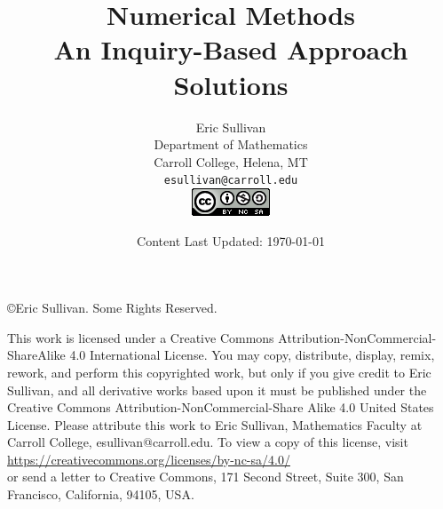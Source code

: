 \documentclass[12pt,oneside]{book}
\title{Numerical Methods \\ An Inquiry-Based Approach
    \ifnum\ShowSoln=1 {\color{red} \\ {\bf Solutions}} \fi}
\date{Content Last Updated: \today}
\author{
Eric Sullivan \\ Department of
Mathematics \\
Carroll College, Helena, MT \\ \texttt{esullivan@carroll.edu} \\
% 
\includegraphics{CreativeCommons.png} %
}
\theoremstyle{definition}
\begin{document}
\maketitle
\newpage
\noindent \copyright Eric Sullivan. Some Rights Reserved.

\vspace{0.2in}
This work is licensed under a Creative Commons Attribution-NonCommercial-ShareAlike 4.0
International License.
You may copy, distribute, display, remix, rework, and perform this copyrighted work, but only if
you give credit to Eric Sullivan, and all derivative works based upon it must be published
under the Creative Commons Attribution-NonCommercial-Share Alike 4.0 United States License. Please
attribute this work to Eric Sullivan, Mathematics Faculty at Carroll College,
esullivan@carroll.edu. To view a copy of this license, visit\\
\href{https://creativecommons.org/licenses/by-nc-sa/4.0/}{https://creativecommons.org/licenses/by-nc-sa/4.0/}\\
or send a letter to Creative Commons, 171 Second Street, Suite 300, San Francisco,
California, 94105, USA.
\tableofcontents









\end{document}
